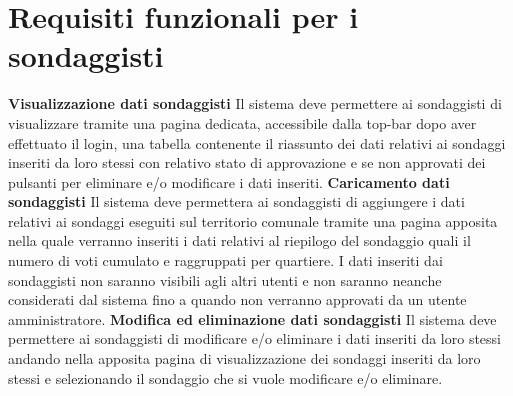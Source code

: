     \section{Requisiti funzionali per i sondaggisti}
        \begin{rfList}
            \rfItem \textbf{Visualizzazione dati sondaggisti} Il sistema deve permettere ai sondaggisti di visualizzare tramite una pagina dedicata, accessibile dalla top-bar dopo aver effettuato il login, una tabella contenente il riassunto dei dati relativi ai sondaggi inseriti da loro stessi con relativo stato di approvazione e se non approvati dei pulsanti per eliminare e/o modificare i dati inseriti. 
            \rfItem \textbf{Caricamento dati sondaggisti} Il sistema deve permettera ai sondaggisti di aggiungere i dati relativi ai sondaggi eseguiti sul territorio comunale tramite una pagina apposita nella quale verranno inseriti i dati relativi al riepilogo del sondaggio quali il numero di voti cumulato e raggruppati per quartiere. I dati inseriti dai sondaggisti non saranno visibili agli altri utenti e non saranno neanche considerati dal sistema fino a quando non verranno approvati da un utente amministratore.
            \rfItem \textbf{Modifica ed eliminazione dati sondaggisti} Il sistema deve permettere ai sondaggisti di modificare e/o eliminare i dati inseriti da loro stessi andando nella apposita pagina di visualizzazione dei sondaggi inseriti da loro stessi e selezionando il sondaggio che si vuole modificare e/o eliminare. 
        \end{rfList}
